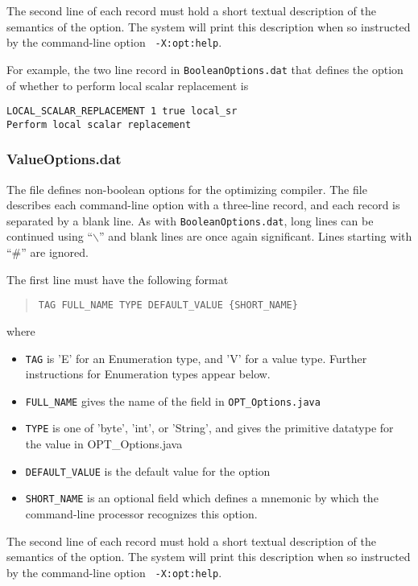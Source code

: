 The second line of each record must hold a short textual description
of the semantics of the option.  The system will print this
description when so instructed by the command-line option {\tt
-X:opt:help}.

For example, the two line record in {\tt BooleanOptions.dat} that
defines the option of whether to perform local scalar replacement is
\begin{verbatim}
LOCAL_SCALAR_REPLACEMENT 1 true local_sr
Perform local scalar replacement
\end{verbatim}

\subsubsection{ValueOptions.dat}

The  file defines non-boolean options for
the optimizing compiler.  The file describes each command-line option 
with a three-line record, and each record is separated
by a blank line.  As with \texttt{BooleanOptions.dat},
long lines can be continued using ``$\backslash$'' and
blank lines are once again significant.
Lines starting with ``\#'' are ignored.

The first line must have the following format
\begin{quote}
\begin{verbatim}
TAG FULL_NAME TYPE DEFAULT_VALUE {SHORT_NAME}
\end{verbatim}
\end{quote}
where
\begin{itemize}
\item {\tt TAG} is 'E' for an Enumeration type, and 'V' for a value type.  Further instructions for Enumeration types appear below.
\item {\tt FULL\_NAME} gives the name of the field in {\tt OPT\_Options.java}
\item {\tt TYPE} is one of 'byte', 'int', or 'String', and gives the primitive datatype for the value in OPT\_Options.java
\item {\tt DEFAULT\_VALUE} is the default value for the option
\item {\tt SHORT\_NAME} is an optional field which defines a mnemonic by which the command-line processor recognizes this option.
\end{itemize}

The second line of each record must hold a short textual description
of the semantics of the option.  The system will print this
description when so instructed by the command-line option {\tt
-X:opt:help}.

